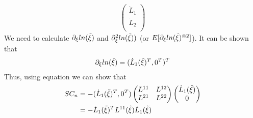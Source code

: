 \documentclass{article}
\begin{document}
\begin{itemize}
\begin{align*}
\begin{pmatrix}
            \dot{L}_1\\
           \dot{L}_2\\
         \end{pmatrix} 
\end{align*} 
We need to calculate $\partial_{\xi}ln(\Tilde{\xi})$ and $\partial_{\xi}^2 ln(\Tilde{\xi}))$ (or $E[\partial_{\xi}ln(\Tilde{\xi})^{\otimes 2}]$). It can be shown that 
\begin{align*}
\partial_{\xi}ln(\Tilde{\xi}) &= (\dot{L}_1(\Tilde{\xi})^T, 0^T)^T \\
\end{align*} 
Thus, using equation we can show that
\begin{align*}
SC_n &= - (\dot{L}_1(\Tilde{\xi})^T, 0^T) \begin{pmatrix}
            L^{11} & L^{12}\\
           L^{21} & L^{22}\\
         \end{pmatrix}  \begin{pmatrix}
            \dot{L}_1(\Tilde{\xi})\\
           0\\
         \end{pmatrix} \\
    &= -\dot{L}_1(\Tilde{\xi})^T L^{11}(\Tilde{\xi}) \dot{L}_1(\Tilde{\xi})
\end{align*} 


\end{itemize}
\end{document}
